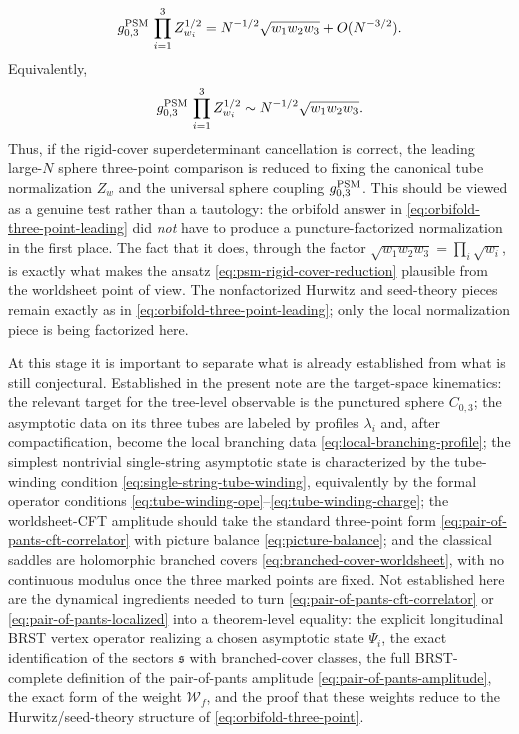 \documentclass[11pt]{article}
\newcommand{\mc}[1]{\mathcal{#1}}
\begin{document}
\begin{equation}\label{eq:psm-normalization-match}
g_{0,3}^{\rm PSM}\,\prod_{i=1}^3 Z_{w_i}^{1/2}
=
N^{-1/2}\sqrt{w_1w_2w_3}+O(N^{-3/2}).
\end{equation}
Equivalently,
\begin{equation}\label{eq:psm-normalization-match-large-n}
g_{0,3}^{\rm PSM}\,\prod_{i=1}^3 Z_{w_i}^{1/2}
\sim
N^{-1/2}\sqrt{w_1w_2w_3}.
\end{equation}
Thus, if the rigid-cover superdeterminant cancellation is correct, the leading large-$N$ sphere three-point comparison is reduced to fixing the canonical tube normalization $Z_w$ and the universal sphere coupling $g_{0,3}^{\rm PSM}$. This should be viewed as a genuine test rather than a tautology: the orbifold answer in \eqref{eq:orbifold-three-point-leading} did \emph{not} have to produce a puncture-factorized normalization in the first place. The fact that it does, through the factor $\sqrt{w_1w_2w_3}=\prod_i\sqrt{w_i}$, is exactly what makes the ansatz \eqref{eq:psm-rigid-cover-reduction} plausible from the worldsheet point of view. The nonfactorized Hurwitz and seed-theory pieces remain exactly as in \eqref{eq:orbifold-three-point-leading}; only the local normalization piece is being factorized here.

At this stage it is important to separate what is already established from what is still conjectural. Established in the present note are the target-space kinematics: the relevant target for the tree-level observable is the punctured sphere $C_{0,3}$; the asymptotic data on its three tubes are labeled by profiles $\lambda_i$ and, after compactification, become the local branching data \eqref{eq:local-branching-profile}; the simplest nontrivial single-string asymptotic state is characterized by the tube-winding condition \eqref{eq:single-string-tube-winding}, equivalently by the formal operator conditions \eqref{eq:tube-winding-ope}--\eqref{eq:tube-winding-charge}; the worldsheet-CFT amplitude should take the standard three-point form \eqref{eq:pair-of-pants-cft-correlator} with picture balance \eqref{eq:picture-balance}; and the classical saddles are holomorphic branched covers \eqref{eq:branched-cover-worldsheet}, with no continuous modulus once the three marked points are fixed. Not established here are the dynamical ingredients needed to turn \eqref{eq:pair-of-pants-cft-correlator} or \eqref{eq:pair-of-pants-localized} into a theorem-level equality: the explicit longitudinal BRST vertex operator realizing a chosen asymptotic state $\Psi_i$, the exact identification of the sectors $\mathfrak s$ with branched-cover classes, the full BRST-complete definition of the pair-of-pants amplitude \eqref{eq:pair-of-pants-amplitude}, the exact form of the weight $\mc W_f$, and the proof that these weights reduce to the Hurwitz/seed-theory structure of \eqref{eq:orbifold-three-point}.
\end{document}
